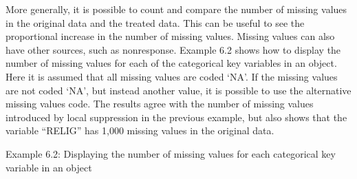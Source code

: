 \documentclass[letterpaper,10pt,english]{sphinxmanual}
\begin{document}
More generally, it is possible to count and compare the number of
missing values in the original data and the treated data. This can be
useful to see the proportional increase in the number of missing values.
Missing values can also have other sources, such as nonresponse. Example
6.2 shows how to display the number of missing values for each of the
categorical key variables in an  object. Here it is assumed
that all missing values are coded ‘NA’. If the missing values are not
coded ‘NA’, but instead another value, it is possible to use the
alternative missing values code. The results agree with the number of
missing values introduced by local suppression in the previous example,
but also shows that the variable “RELIG” has 1,000 missing values in the
original data.

Example 6.2: Displaying the number of missing values for each
categorical key variable in an  object
\end{document}
